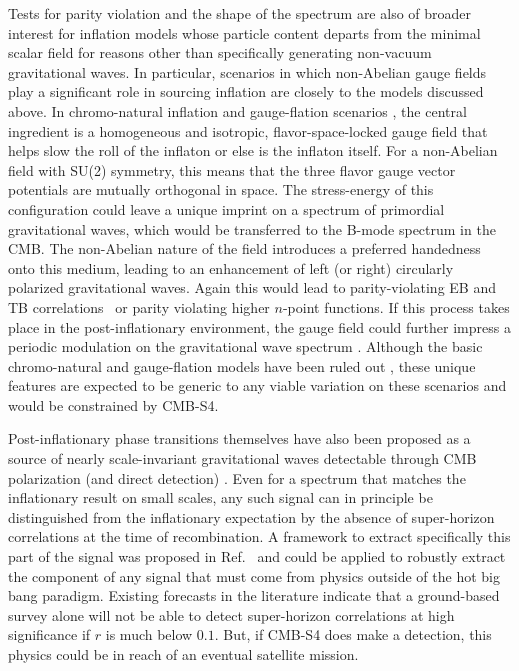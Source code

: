 Tests for parity violation and the shape of the spectrum are also of broader interest for inflation models whose particle content departs from the minimal scalar field for reasons other than specifically generating non-vacuum gravitational waves. In particular, scenarios in which non-Abelian gauge fields play a significant role in sourcing inflation are closely to the models discussed above. In chromo-natural inflation and gauge-flation scenarios \cite{Maleknejad:2011jw,Adshead:2012kp,Adshead:2012qe,Adshead:2013qp,Adshead:2013nka,Dimastrogiovanni:2012st,Dimastrogiovanni:2012ew}, the central ingredient is a homogeneous and isotropic, flavor-space-locked gauge field that helps slow the roll of the inflaton or else is the inflaton itself. For a non-Abelian field with SU(2) symmetry, this means that the three flavor gauge vector potentials are mutually orthogonal in space. The stress-energy of this configuration could leave a unique imprint on a spectrum of primordial gravitational waves, which would be transferred to the B-mode spectrum in the CMB. The non-Abelian nature of the field introduces a preferred handedness onto this medium, leading to an enhancement of left (or right) circularly polarized gravitational waves. Again this would lead to parity-violating EB and TB correlations~\cite{Lue:1998mq,Gluscevic:2010vv} or parity violating higher $n$-point functions. If this process takes place in the post-inflationary environment, the gauge field could further impress a periodic modulation on the gravitational wave spectrum \cite{Bielefeld:2014nza,Bielefeld:2015daa}. Although the basic chromo-natural and gauge-flation models have been ruled out \cite{Namba:2013kia}, these unique features are expected to be generic to any viable variation on these scenarios and would be constrained by CMB-S4.

Post-inflationary phase transitions themselves have also been proposed as a source of nearly scale-invariant gravitational waves detectable through CMB polarization (and direct detection) \cite{Krauss:1991qu,JonesSmith:2007ne,Giblin:2011yh,Figueroa:2012kw,Fenu:2013tea}. Even for a spectrum that matches the inflationary result on small scales, any such signal can in principle be distinguished from the inflationary expectation by the absence of super-horizon correlations at the time of recombination. A framework to extract specifically this part of the signal was proposed in Ref.~\cite{Baumann:2009mq} and could be applied to robustly extract the component of any signal that must come from physics outside of the hot big bang paradigm. Existing forecasts in the literature \cite{Lee:2014cya} indicate that a ground-based survey alone will not be able to detect super-horizon correlations at high significance if $r$ is much below $0.1$. But, if CMB-S4 does make a detection, this physics could be in reach of an eventual satellite mission.

